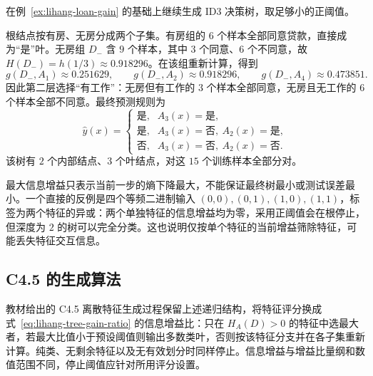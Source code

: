 \begin{example}
\label{ex:lihang-loan-id3}
在例~\ref{ex:lihang-loan-gain} 的基础上继续生成 ID3 决策树，取足够小的正阈值。
\end{example}
\begin{solve}
根结点按有房、无房分成两个子集。有房组的 $6$ 个样本全部同意贷款，直接成为“是”叶。无房组 $D_-$ 含 $9$ 个样本，其中 $3$ 个同意、$6$ 个不同意，故 $H(D_-)=h(1/3)\approx0.918296$。在该组重新计算，得到
\[
  g(D_-,A_1)\approx0.251629,\qquad
  g(D_-,A_2)\approx0.918296,\qquad
  g(D_-,A_4)\approx0.473851.
\]
因此第二层选择“有工作”：无房但有工作的 $3$ 个样本全部同意，无房且无工作的 $6$ 个样本全部不同意。最终预测规则为
\begin{equation}
  \widehat y(x)=
  \begin{cases}
    \text{是},& A_3(x)=\text{是},\\
    \text{是},& A_3(x)=\text{否},\ A_2(x)=\text{是},\\
    \text{否},& A_3(x)=\text{否},\ A_2(x)=\text{否}.
  \end{cases}
  \label{eq:lihang-loan-tree}
\end{equation}
该树有 $2$ 个内部结点、$3$ 个叶结点，对这 $15$ 个训练样本全部分对。
\end{solve}

最大信息增益只表示当前一步的熵下降最大，不能保证最终树最小或测试误差最小。一个直接的反例是四个等频二进制输入 $(0,0),(0,1),(1,0),(1,1)$，标签为两个特征的异或：两个单独特征的信息增益均为零，采用正阈值会在根停止，但深度为 $2$ 的树可以完全分类。这也说明仅按单个特征的当前增益筛除特征，可能丢失特征交互信息。

\subsection{C4.5 的生成算法}

教材给出的 C4.5 离散特征生成过程保留上述递归结构，将特征评分换成式~\eqref{eq:lihang-tree-gain-ratio} 的信息增益比：只在 $H_A(D)>0$ 的特征中选最大者，若最大比值小于预设阈值则输出多数类叶，否则按该特征分支并在各子集重新计算。纯类、无剩余特征以及无有效划分时同样停止。信息增益与增益比量纲和数值范围不同，停止阈值应针对所用评分设置。

